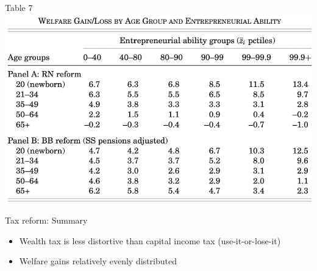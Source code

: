 \documentclass[aspectratio=169,mathserif]{beamer}
\begin{document}
\begin{frame}{Table 7}
    \centering
    \includegraphics[scale = 0.4]{GKKOC_Tab7.png}
\end{frame}

\begin{frame}{Tax reform: Summary}
    \begin{itemize}
        \item Wealth tax is less distortive than capital income tax (use-it-or-lose-it)
        \item Welfare gains relatively evenly distributed%
    \end{itemize}
\end{frame}

\section{\cite{boar2023income-or-wealth}}
\end{document}
